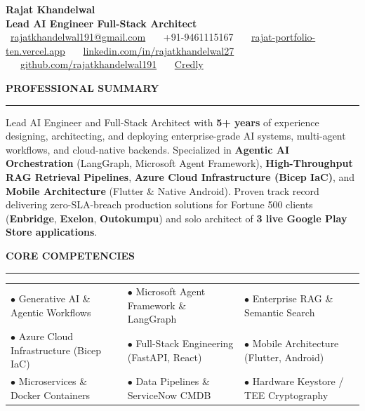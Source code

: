 \documentclass[10pt,a4paper]{article}
\newcommand{\sectiontitle}[1]{%
    \vspace{4pt}
    {\normalsize\textbf{\uppercase{\textcolor{primary}{#1}}}}
    \vspace{-3pt}
    \par\textcolor{primary}{\rule{\textwidth}{0.6pt}}
    \vspace{2pt}
}
\begin{document}
\begin{center}
    {\LARGE\textbf{\textcolor{primary}{Rajat Khandelwal}}}\\[2pt]
    {\small\textbf{\textcolor{subtitle}{Lead AI Engineer \quad\textbar\quad Full-Stack Architect}}}\\[3pt]
    {\scriptsize
        \faEnvelope\ \href{mailto:rajatkhandelwal191@gmail.com}{rajatkhandelwal191@gmail.com} \ \textbar\ 
        \faPhone*\ +91-9461115167 \ \textbar\ 
        \faGlobe\ \href{https://rajat-portfolio-ten.vercel.app/}{rajat-portfolio-ten.vercel.app} \ \textbar\ 
        \faLinkedin\ \href{https://linkedin.com/in/rajatkhandelwal27}{linkedin.com/in/rajatkhandelwal27} \ \textbar\ 
        \faGithub\ \href{https://github.com/rajatkhandelwal191}{github.com/rajatkhandelwal191} \ \textbar\ 
        \faCertificate\ \href{https://www.credly.com/users/rajat-khandelwal.b764d962}{Credly}
    }
\end{center}

\vspace{-5pt}

\sectiontitle{Professional Summary}
{\small Lead AI Engineer and Full-Stack Architect with \textbf{5+ years} of experience designing, architecting, and deploying enterprise-grade AI systems, multi-agent workflows, and cloud-native backends. Specialized in \textbf{Agentic AI Orchestration} (LangGraph, Microsoft Agent Framework), \textbf{High-Throughput RAG Retrieval Pipelines}, \textbf{Azure Cloud Infrastructure (Bicep IaC)}, and \textbf{Mobile Architecture} (Flutter \& Native Android). Proven track record delivering zero-SLA-breach production solutions for Fortune 500 clients (\textbf{Enbridge}, \textbf{Exelon}, \textbf{Outokumpu}) and solo architect of \textbf{3 live Google Play Store applications}.}

\sectiontitle{Core Competencies}
{\footnotesize
\begin{tabularx}{\textwidth}{@{} >{\raggedright\arraybackslash}X >{\raggedright\arraybackslash}X >{\raggedright\arraybackslash}X @{}}
$\bullet$ Generative AI \& Agentic Workflows & $\bullet$ Microsoft Agent Framework \& LangGraph & $\bullet$ Enterprise RAG \& Semantic Search \\
$\bullet$ Azure Cloud Infrastructure (Bicep IaC) & $\bullet$ Full-Stack Engineering (FastAPI, React) & $\bullet$ Mobile Architecture (Flutter, Android) \\
$\bullet$ Microservices \& Docker Containers & $\bullet$ Data Pipelines \& ServiceNow CMDB & $\bullet$ Hardware Keystore / TEE Cryptography
\end{tabularx}
}
\end{document}
